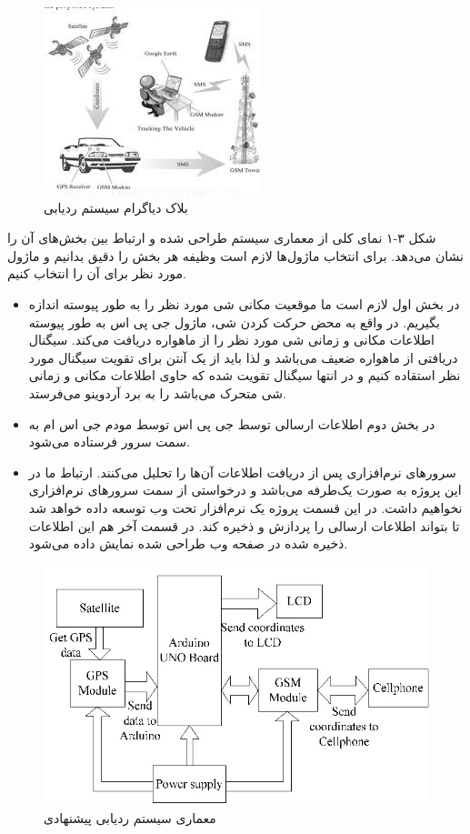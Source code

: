 \begin{figure}[!h]
	\centerline{\includegraphics[width=.5\textwidth]{architecture}}
	\caption{بلاک دیاگرام سیستم ردیابی}
\end{figure}
شکل ۳-۱ نمای کلی از معماری سیستم طراحی شده و ارتباط بین بخش‌های آن را نشان می‌دهد. برای انتخاب ماژول‌ها لازم است وظیفه هر بخش را دقیق بدانیم و ماژول مورد نظر برای آن را انتخاب کنیم.
\begin{itemize}
	\item 
	در بخش اول لازم است ما موقعیت مکانی شی مورد نظر را به طور پیوسته اندازه بگیریم. در واقع به محض حرکت کردن شی، ماژول جی پی اس به طور پیوسته اطلاعات مکانی و زمانی شی مورد نظر را از ماهواره دریافت می‌کند. سیگنال دریافتی از ماهواره ضعیف می‌باشد و لذا باید از یک آنتن برای تقویت سیگنال مورد نظر استقاده کنیم و در انتها سیگنال تقویت شده که حاوی اطلاعات مکانی و زمانی شی متحرک می‌باشد را به برد آردوینو می‌فرستد.
	\item 
	در بخش دوم اطلاعات ارسالی توسط جی پی اس توسط مودم جی اس ام به سمت سرور فرستاده می‌شود.
	\item 
	سرورهای نرم‌افزاری پس از دریافت اطلاعات آن‌ها را تحلیل می‌کنند. ارتباط ما در این پروژه به صورت یک‌طرفه می‌باشد و درخواستی از سمت سرورهای نرم‌افزاری نخواهیم داشت. در این قسمت پروژه یک نرم‌افزار تحت وب توسعه داده خواهد شد تا بتواند اطلاعات ارسالی را پردازش و ذخیره کند. در قسمت آخر هم این اطلاعات ذخیره شده در صفحه وب طراحی شده نمایش داده می‌شود. 	 
\end{itemize}
\begin{figure}[!h]
	\centerline{\includegraphics[width=.5\textwidth]{blockdiagram}}
	\caption{معماری سیستم ردیابی پیشنهادی}
\end{figure}
